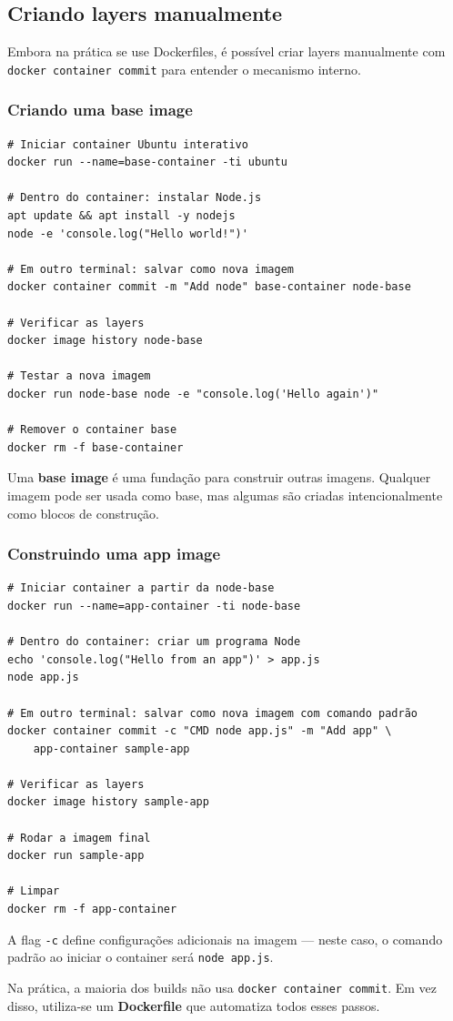 \subsection{Criando layers manualmente}

Embora na prática se use Dockerfiles, é possível criar layers manualmente com \texttt{docker container commit} para entender o mecanismo interno.

\subsubsection{Criando uma base image}

\begin{verbatim}
# Iniciar container Ubuntu interativo
docker run --name=base-container -ti ubuntu

# Dentro do container: instalar Node.js
apt update && apt install -y nodejs
node -e 'console.log("Hello world!")'

# Em outro terminal: salvar como nova imagem
docker container commit -m "Add node" base-container node-base

# Verificar as layers
docker image history node-base

# Testar a nova imagem
docker run node-base node -e "console.log('Hello again')"

# Remover o container base
docker rm -f base-container
\end{verbatim}

Uma \textbf{base image} é uma fundação para construir outras imagens. Qualquer imagem pode ser usada como base, mas algumas são criadas intencionalmente como blocos de construção.

\subsubsection{Construindo uma app image}

\begin{verbatim}
# Iniciar container a partir da node-base
docker run --name=app-container -ti node-base

# Dentro do container: criar um programa Node
echo 'console.log("Hello from an app")' > app.js
node app.js

# Em outro terminal: salvar como nova imagem com comando padrão
docker container commit -c "CMD node app.js" -m "Add app" \
    app-container sample-app

# Verificar as layers
docker image history sample-app

# Rodar a imagem final
docker run sample-app

# Limpar
docker rm -f app-container
\end{verbatim}

A flag \texttt{-c} define configurações adicionais na imagem --- neste caso, o comando padrão ao iniciar o container será \texttt{node app.js}.

Na prática, a maioria dos builds não usa \texttt{docker container commit}. Em vez disso, utiliza-se um \textbf{Dockerfile} que automatiza todos esses passos.
